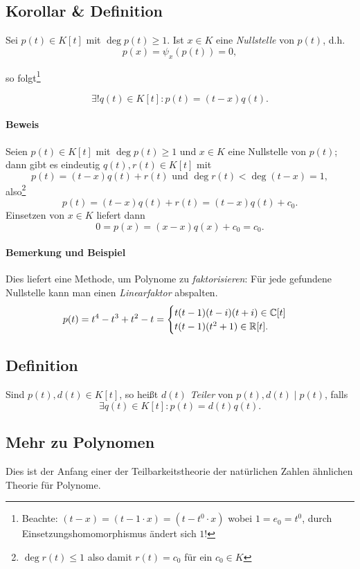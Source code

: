 \subsection{Korollar \& Definition}
	\begin{Definition}[Nullstelle]
	Sei $ p(t)\in K[t] $ mit $ \deg p(t)\geq 1 $. Ist $ x\in K $ eine \emph{Nullstelle} von $ p(t) $, d.h.
		\[ p(x) = \psi_x(p(t)) = 0, \]
	\end{Definition}
	so folgt\footnote{Beachte: $(t-x)=(t- 1\cdot x)=(t-t^0\cdot x)$ wobei $1=e_0=t^0$, durch Einsetzungshomomorphismus ändert sich $1$!}
	\begin{Korollar}
		\[ \exists! q(t)\in K[t]: p(t) = (t-x) q(t). \]
	\end{Korollar}
\paragraph{Beweis}
	Seien $ p(t)\in K[t] $ mit $ \deg p(t) \geq 1 $ und $ x\in K $ eine Nullstelle von $ p(t) $; dann gibt es eindeutig $ q(t),r(t) \in K[t] $ mit
		\[ p(t) = (t-x) q(t) + r(t) \text{ und } \deg r(t) < \deg (t-x) = 1, \]
	also\footnote{$\deg r(t)\leq 1$ also damit $r(t)=c_0$ für ein $c_0\in K$}
		\[ p(t) = (t-x)q(t)+r(t) = (t-x)q(t)+c_0. \]
	Einsetzen von $ x\in K $ liefert dann
		\[ 0 = p(x) = (x-x)q(x) + c_0 = c_0. \]
\paragraph{Bemerkung und Beispiel}
	Dies liefert eine Methode, um Polynome zu \emph{faktorisieren}: Für jede gefundene Nullstelle kann man einen \emph{Linearfaktor} abspalten.
		\[ p(t)= t^4-t^3+t^2-t =
			\begin{cases}
				t(t-1)(t-i)(t+i) \in \mathbb{C}[t]\\
				t(t-1)(t^2+1) \in \mathbb{R}[t].
			\end{cases} \]

\subsection{Definition}
	\begin{Definition}[Teiler]
		Sind $ p(t),d(t)\in K[t] $, so heißt $ d(t) $ \emph{Teiler} von $ p(t), d(t)\mid p(t) $, falls
			\[ \exists q(t)\in K[t]: p(t)= d(t)q(t). \]
	\end{Definition}

\subsection{Mehr zu Polynomen}
	Dies ist der Anfang einer der Teilbarkeitstheorie der natürlichen Zahlen ähnlichen Theorie für Polynome.
	
